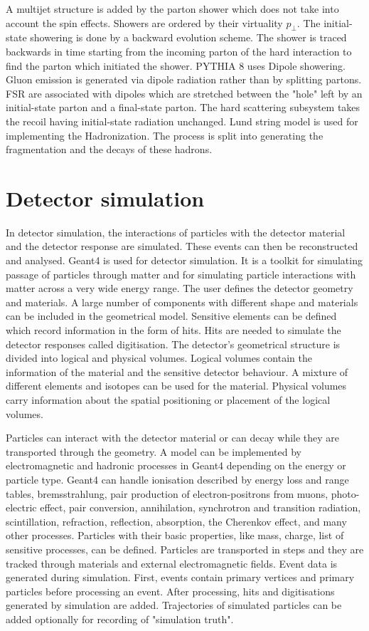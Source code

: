 A multijet structure is added by the parton shower which does not take into account the spin effects. Showers are ordered by their virtuality $p_{\perp}$. The initial-state showering is done by a backward evolution scheme. The shower is traced backwards in time starting from the incoming parton of the hard interaction to find the parton which initiated the shower. PYTHIA 8 uses Dipole showering. Gluon emission is generated via dipole radiation rather than by splitting partons. FSR are associated with dipoles which are stretched between the "hole" left by an initial-state parton and a final-state parton. The hard scattering subsystem takes the recoil having initial-state radiation unchanged. Lund string model is used for implementing the Hadronization. The process is split into generating the fragmentation and the decays of these hadrons.


\section{Detector simulation}

In detector simulation, the interactions of particles with the detector material and the detector response are simulated. These events can then be reconstructed and analysed. Geant4 \cite{Agostinelli:2002hh} is used for detector simulation. It is a toolkit for simulating passage of particles through matter and for simulating particle interactions with matter across a very wide energy range. The user defines the detector geometry and materials. A large number of components with different shape and materials can be included in the geometrical model. Sensitive elements can be defined which record information in the form of hits. Hits are needed to simulate the detector responses called digitisation. The detector's geometrical structure is divided into logical and physical volumes. Logical volumes contain the information of the material and the sensitive detector behaviour. A mixture of different elements and isotopes can be used for the material. Physical volumes carry information about the spatial positioning or placement of the logical volumes.

Particles can interact with the detector material or can decay while they are transported through the geometry. A model can be implemented by electromagnetic and hadronic processes in Geant4 depending on the energy or particle type. Geant4 can handle ionisation described by energy loss and range tables, bremsstrahlung, pair production of electron-positrons from muons, photo-electric effect, pair conversion, annihilation, synchrotron and transition radiation, scintillation, refraction, reflection, absorption, the Cherenkov effect, and many other processes. Particles with their basic properties, like mass, charge, list of sensitive processes, can be defined. Particles are transported in steps and they are tracked through materials and external electromagnetic fields. Event data is generated during simulation. First, events contain primary vertices and primary particles before processing an event. After processing, hits and digitisations generated by simulation are added. Trajectories of simulated particles can be added optionally for recording of "simulation truth".

